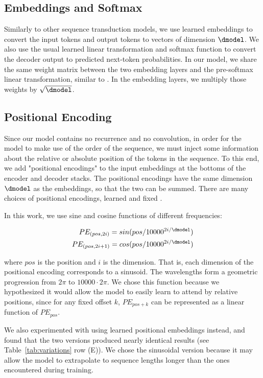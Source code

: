   \subsection{Embeddings and Softmax}
  Similarly to other sequence transduction models, we use learned embeddings to convert the input tokens and output tokens to vectors of dimension $\dmodel$.  We also use the usual learned linear transformation and softmax function to convert the decoder output to predicted next-token probabilities.  In our model, we share the same weight matrix between the two embedding layers and the pre-softmax linear transformation, similar to \citep{press2016using}.   In the embedding layers, we multiply those weights by $\sqrt{\dmodel}$.
  
  
  \subsection{Positional Encoding}
  Since our model contains no recurrence and no convolution, in order for the model to make use of the order of the sequence, we must inject some information about the relative or absolute position of the tokens in the sequence.  To this end, we add "positional encodings" to the input embeddings at the bottoms of the encoder and decoder stacks.  The positional encodings have the same dimension $\dmodel$ as the embeddings, so that the two can be summed.   There are many choices of positional encodings, learned and fixed \citep{JonasFaceNet2017}.
  
  In this work, we use sine and cosine functions of different frequencies:
  
  \begin{align*}
      PE_{(pos,2i)} = sin(pos / 10000^{2i/\dmodel}) \\
      PE_{(pos,2i+1)} = cos(pos / 10000^{2i/\dmodel})
  \end{align*}
  
  where $pos$ is the position and $i$ is the dimension.  That is, each dimension of the positional encoding corresponds to a sinusoid.  The wavelengths form a geometric progression from $2\pi$ to $10000 \cdot 2\pi$.  We chose this function because we hypothesized it would allow the model to easily learn to attend by relative positions, since for any fixed offset $k$, $PE_{pos+k}$ can be represented as a linear function of $PE_{pos}$.
  
  We also experimented with using learned positional embeddings \citep{JonasFaceNet2017} instead, and found that the two versions produced nearly identical results (see Table~\ref{tab:variations} row (E)).  We chose the sinusoidal version because it may allow the model to extrapolate to sequence lengths longer than the ones encountered during training.
  
